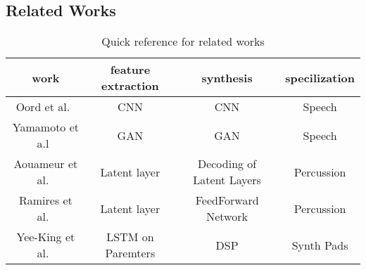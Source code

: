 \documentclass[\main/thesis.tex]{subfiles}
\begin{document}




\subsection{Related Works}
\label{related}

\begin{center}
\begin{table}[]
\begin{tabular}{||c c c c||} 
\hline
work & feature extraction & synthesis & specilization  \\
	\hline
Oord et al.~\cite{oord2016wavenet} & CNN & CNN &Speech \\ 
	\hline
Yamamoto et a.l~\cite{yamamoto2020parallel} & GAN & GAN&Speech  \\ 
	\hline
Aouameur et al.~\cite{aouameur2019neural} & Latent layer& Decoding of Latent Layers & Percussion  \\ 
	\hline
Ramires et al.~\cite{ramires2020neural} & Latent layer & FeedForward Network & Percussion  \\ 
	\hline
Yee-King et al.~\cite{yee2018automatic} & LSTM on Paremters & DSP & Synth Pads  \\ 
	\hline
\end{tabular}
\caption{Quick reference for related works}
\end{table}
\end{center}
\end{document}
